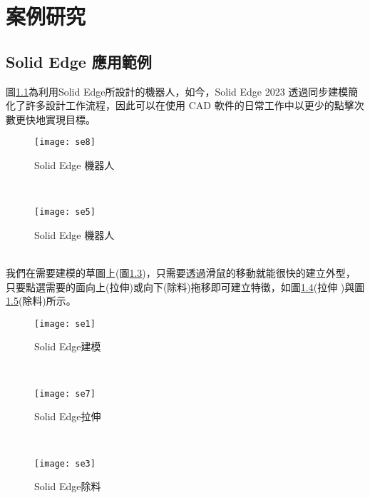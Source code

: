 \chapter{案例研究}
\section{Solid Edge 應用範例}
圖\ref{3.20}為利用Solid Edge所設計的機器人，如今，Solid Edge 2023 透過同步建模簡化了許多設計工作流程，因此可以在使用 CAD 軟件的日常工作中以更少的點擊次數更快地實現目標。\\
\begin{figure}[hbt!]
\begin{center}
\texttt{[image: se8]}
\caption{\Large Solid Edge 機器人}\label{3.20}
\end{center}
\end{figure}
\\
\begin{figure}[hbt!]
\begin{center}
\texttt{[image: se5]}
\caption{\Large Solid Edge 機器人}\label{3.27}
\end{center}
\end{figure}
\\

我們在需要建模的草圖上(圖\ref{3.21})，只需要透過滑鼠的移動就能很快的建立外型，只要點選需要的面向上(拉伸)或向下(除料)拖移即可建立特徵，如圖\ref{3.22}(拉伸 )與圖\ref{3.23}(除料)所示。\\
\begin{figure}[hbt!]
\begin{center}
\texttt{[image: se1]}
\caption{\Large Solid Edge建模}\label{3.21}
\end{center}
\end{figure}
\\
\begin{figure}[hbt!]
\begin{center}
\texttt{[image: se7]}
\caption{\Large Solid Edge拉伸}\label{3.22}
\end{center}
\end{figure}
\\
\begin{figure}[hbt!]
\begin{center}
\texttt{[image: se3]}
\caption{\Large Solid Edge除料}\label{3.23}
\end{center}
\end{figure}
\\


